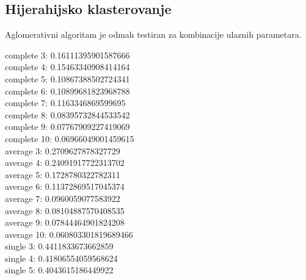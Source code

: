 \documentclass[a4paper, 11pt]{article}
\begin{document}
\subsection{Hijerahijsko klasterovanje}
Aglomerativni algoritam je odmah testiran za kombinacije ulaznih parametara.\\

{\scriptsize
\begin{multicols}{2}
complete
3:
0.16111395901587666\\

complete
4:
0.15463340908414164\\

complete
5:
0.10867388502724341\\

complete
6:
0.10899681823968788\\

complete
7:
0.1163346869599695\\

complete
8:
0.08395732844533542\\

complete
9:
0.07767909227419069\\

complete
10:
0.06966049001459615\\

average
3:
0.2709627878327729\\

average
4:
0.24091917722313702\\

average
5:
0.1728780322782311\\

average
6:
0.11372869517045374\\

average
7:
0.0960059077583922\\

average
8:
0.08104887570408535\\

average
9:
0.07844464901824208\\

average
10:
0.060803301819689466\\

single
3:
0.4411833673662859\\

single
4:
0.41806554059568624\\

single
5:
0.4043615186449922\\


\end{multicols}}
\end{document}
